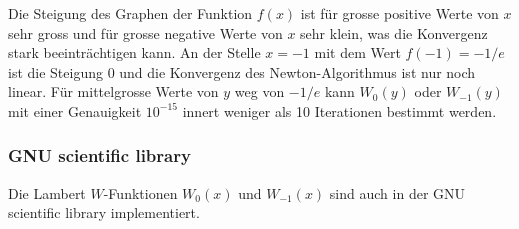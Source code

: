 Die Steigung des Graphen der Funktion $f(x)$ ist für grosse positive
Werte von $x$ sehr gross und für grosse negative Werte von $x$ sehr
klein, was die Konvergenz stark beeinträchtigen kann.
An der Stelle $x=-1$ mit dem Wert $f(-1)=-1/e$ ist die Steigung $0$
und die Konvergenz des Newton-Algorithmus ist nur noch linear.
Für mittelgrosse Werte von $y$ weg von $-1/e$ kann $W_0(y)$ oder $W_{-1}(y)$ 
mit einer Genauigkeit $10^{-15}$ innert weniger als 10 Iterationen
bestimmt werden.

\subsubsection{GNU scientific library}
Die Lambert $W$-Funktionen $W_0(x)$ und $W_{-1}(x)$ sind auch in der
GNU scientific library \cite{buch:library:gsl} implementiert.
%








